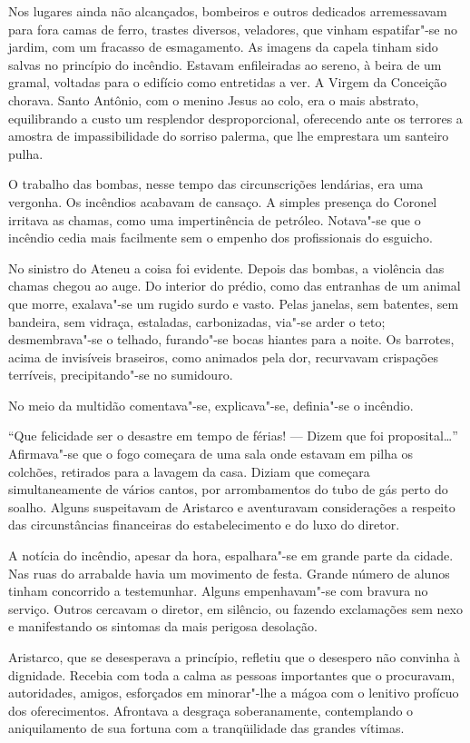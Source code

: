 Nos lugares ainda não alcançados, bombeiros e
outros dedicados arremessavam para fora camas de ferro, trastes
diversos, veladores, que vinham espatifar"-se no jardim, com um
fracasso de esmagamento. As imagens da capela tinham sido salvas no
princípio do incêndio. Estavam enfileiradas ao sereno, à beira de um
gramal, voltadas para o edifício como entretidas a ver. A Virgem da
Conceição chorava. Santo Antônio, com o menino Jesus ao colo, era o
mais abstrato, equilibrando a custo um resplendor desproporcional,
oferecendo ante os terrores a amostra de impassibilidade do sorriso
palerma, que lhe emprestara um santeiro pulha. 

O trabalho das bombas,
nesse tempo das circunscrições lendárias, era uma vergonha. Os
incêndios acabavam de cansaço. A simples presença do Coronel irritava
as chamas, como uma impertinência de petróleo. Notava"-se que o
incêndio cedia mais facilmente sem o empenho dos profissionais do
esguicho. 

No sinistro do Ateneu a coisa foi evidente. Depois das
bombas, a violência das chamas chegou ao auge. Do interior do prédio,
como das entranhas de um animal que morre, exalava"-se um rugido surdo
e vasto. Pelas janelas, sem batentes, sem bandeira, sem vidraça,
estaladas, carbonizadas, via"-se arder o teto; desmembrava"-se o
telhado, furando"-se bocas hiantes para a noite. Os barrotes, acima de
invisíveis braseiros, como animados pela dor, recurvavam crispações
terríveis, precipitando"-se no sumidouro. 

No meio da multidão comentava"-se, explicava"-se, definia"-se o incêndio. 

``Que felicidade ser o desastre em tempo de férias! --- Dizem que foi
proposital\ldots{}'' Afirmava"-se que o fogo começara de uma sala onde
estavam em pilha os colchões, retirados para a lavagem da casa. Diziam
que começara simultaneamente de vários cantos, por arrombamentos do
tubo de gás perto do soalho. Alguns suspeitavam de Aristarco e
aventuravam considerações a respeito das circunstâncias financeiras do
estabelecimento e do luxo do diretor. 

A notícia do incêndio, apesar da
hora, espalhara"-se em grande parte da cidade. Nas ruas do arrabalde
havia um movimento de festa. Grande número de alunos tinham concorrido
a testemunhar. Alguns empenhavam"-se com bravura no serviço. Outros
cercavam o diretor, em silêncio, ou fazendo 
exclamações sem nexo e manifestando os sintomas da mais perigosa
desolação. 

Aristarco, que se desesperava a princípio, refletiu que o
desespero não convinha à dignidade. Recebia com toda a calma as pessoas
importantes que o procuravam, autoridades, amigos, esforçados em
minorar"-lhe a mágoa com o lenitivo profícuo dos oferecimentos.
Afrontava a desgraça soberanamente, contemplando o aniquilamento de sua
fortuna com a tranqüilidade das grandes vítimas. 

